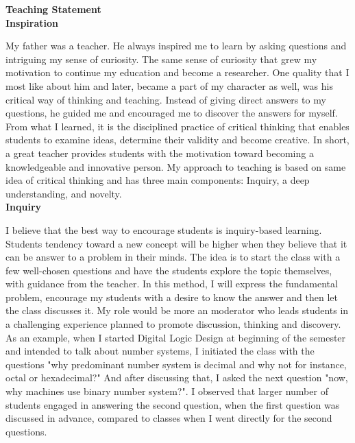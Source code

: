 {\bf Teaching Statement}
\vspace*{3\baselineskip}\\
{\bf Inspiration}

My father was a teacher. He always inspired me to learn by asking questions and intriguing my sense of curiosity. The same sense of curiosity  that grew my motivation to continue  my education and become a researcher. One quality that I most like about him and later, became a part of my character as well, was his critical way of thinking and teaching.  Instead of giving direct answers to my questions, he guided me and encouraged me to discover the answers for myself.
 From what I learned, it is the disciplined practice of critical thinking that
enables  students to examine ideas, determine their validity and become creative.  
In short,  a great teacher provides students with the motivation toward becoming a knowledgeable and innovative person.
My approach to teaching
 is based on same idea of critical thinking and has three main components: Inquiry,  a deep understanding, and novelty.
 \\ [0.2cm]
{\bf Inquiry }

I believe that the best way  to encourage students is inquiry-based learning. 
Students tendency toward a new concept will be higher when they believe that it can be answer to a problem in their minds.  
The idea is to start the class with a few well-chosen questions and have the students explore the topic themselves, with guidance from the teacher. 
In this method, I will express the fundamental problem,
 encourage my students with a desire to know the answer and then  let the class  discusses it. 
 My role would be more an moderator who leads students in a challenging experience  planned to promote discussion, thinking and discovery. As an example,  when I started Digital Logic Design at  beginning of the semester and intended to talk about number systems,  I initiated the class with the questions  "why predominant number system is decimal and why not for instance, octal or hexadecimal?"
 And after discussing that, I asked the next question "now, why machines use binary number system?".  I observed that larger number of students engaged in answering the second question, when the first question was discussed in advance, compared to classes when I went directly for the second questions. 


